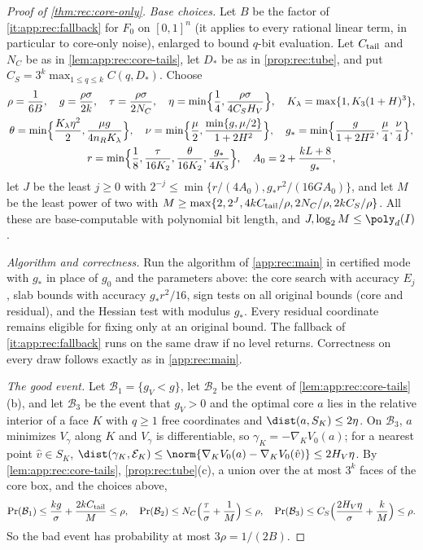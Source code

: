 \begin{proof}[Proof of \cref{thm:rec:core-only}]
\emph{Base choices.} Let $B$ be the factor of \ref{it:app:rec:fallback} for
$F_0$ on $[0,1]^n$ (it applies to every rational linear term, in particular to
core-only noise), enlarged to bound $q$-bit evaluation. Let $C_{\rm tail}$ and
$N_C$ be as in \cref{lem:app:rec:core-tails}, let $D_*$ be as in
\cref{prop:rec:tube}, and put $C_S=3^k\max_{1\le q\le k}C(q,D_*)$. Choose
\begin{equation}\label{eq:app:rec:core-params}
\begin{gathered}
 \rho=\frac1{6B},\quad g=\frac{\rho\sigma}{2k},\quad
 \tau=\frac{\rho\sigma}{2N_C},\quad
 \eta=\min\Bigl\{\frac14,\frac{\rho\sigma}{4C_SH_V}\Bigr\},\quad
 K_\lambda=\max\{1,K_3(1+H)^3\},\\
 \theta=\min\Bigl\{\frac{K_\lambda\eta^2}2,\frac{\mu g}{4n_RK_\lambda}\Bigr\},\quad
 \nu=\min\Bigl\{\frac\mu2,\frac{\min\{g,\mu/2\}}{1+2H^2}\Bigr\},\quad
 g_*=\min\Bigl\{\frac g{1+2H^2},\frac\mu4,\frac\nu4\Bigr\},\\
 r=\min\Bigl\{\frac18,\frac\tau{16K_2},\frac\theta{16K_2},\frac{g_*}{4K_3}\Bigr\},\quad
 A_0=2+\frac{kL+8}{g_*},
\end{gathered}
\end{equation}
let $J$ be the least $j\ge0$ with
$2^{-j}\le\min\{r/(4A_0),g_*r^2/(16GA_0)\}$, and let $M$ be the least power of
two with $M\ge\max\{2,2^J,4kC_{\rm tail}/\rho,2N_C/\rho,2kC_S/\rho\}$. All these
are base-computable with polynomial bit length, and $J,\log_2M\le\poly_d(I)$.

\emph{Algorithm and correctness.} Run the algorithm of \cref{app:rec:main} in
certified mode with $g_*$ in place of $g_0$ and the parameters above: the core
search with accuracy $E_j$, slab bounds with accuracy $g_*r^2/16$, sign tests on
all original bounds (core and residual), and the Hessian test with modulus
$g_*$. Every residual coordinate remains eligible for fixing only at an original
bound. The fallback of \ref{it:app:rec:fallback} runs on the same draw if no
level returns. Correctness on every draw follows exactly as in
\cref{app:rec:main}.

\emph{The good event.} Let $\mathcal B_1=\{g_V<g\}$, let $\mathcal B_2$ be the
event of \cref{lem:app:rec:core-tails}(b), and let $\mathcal B_3$ be the event
that $g_V>0$ and the optimal core $a$ lies in the relative interior of a face
$K$ with $q\ge1$ free coordinates and $\dist(a,S_K)\le2\eta$. On $\mathcal B_3$,
$a$ minimizes $V_\gamma$ along $K$ and $V_\gamma$ is differentiable, so
$\gamma_K=-\nabla_KV_0(a)$; for a nearest point $\hat v\in S_K$,
$\dist(\gamma_K,\mathcal E_K)\le\norm{\nabla_KV_0(a)-\nabla_KV_0(\hat v)}
\le2H_V\eta$. By \cref{lem:app:rec:core-tails}, \cref{prop:rec:tube}(c), a union
over the at most $3^k$ faces of the core box, and the choices above,
\[
 \Pr(\mathcal B_1)\le\frac{kg}\sigma+\frac{2kC_{\rm tail}}M\le\rho,\quad
 \Pr(\mathcal B_2)\le N_C\Bigl(\frac\tau\sigma+\frac1M\Bigr)\le\rho,\quad
 \Pr(\mathcal B_3)\le C_S\Bigl(\frac{2H_V\eta}\sigma+\frac kM\Bigr)\le\rho .
\]
So the bad event has probability at most $3\rho=1/(2B)$.


\end{proof}
